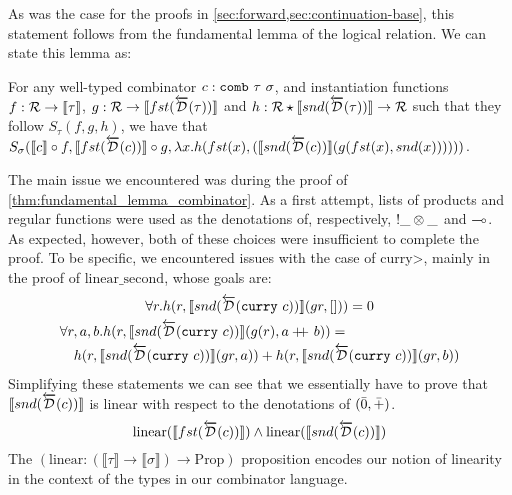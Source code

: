   As was the case for the proofs in \cref{sec:forward,sec:continuation-base}, this statement follows from the fundamental lemma of the logical relation.
  We can state this lemma as:
  \begin{proposition}\label{thm:fundamental_lemma_combinator}
    For any well-typed combinator $c : \texttt{comb}\ \tau\ \sigma$, and instantiation functions $f : \mathcal{R} \rightarrow \llbracket \tau \rrbracket$, $g : \mathcal{R} \rightarrow \llbracket fst(\overleftarrow{\mathcal{D}}(\tau))\rrbracket$ and $h : \mathcal{R} \star \llbracket snd(\overleftarrow{\mathcal{D}}(\tau)) \rrbracket \rightarrow \mathcal{R}$ such that they follow $S_{\tau}(f, g, h)$, we have that $S_{\sigma}(\llbracket c\rrbracket \circ f, \llbracket fst(\Drev(c))\rrbracket \circ g, \lambda x. h (fst(x), \linebreak (\llbracket snd(\Drev(c))\rrbracket(g(fst(x), snd(x))))))$.
  \end{proposition}

  The main issue we encountered was during the proof of \cref{thm:fundamental_lemma_combinator}.
  As a first attempt, lists of products and regular functions were used as the denotations of, respectively, $!\_\otimes\_$ and $\multimap$.
  As expected, however, both of these choices were insufficient to complete the proof.
  To be specific, we encountered issues with the case of \<curry>, mainly in the proof of $\text{linear\_second}$, whose goals are:
  \begin{gather}
    \begin{multlined}\label{eqn:goal_1}
      \forall r. h(r, \llbracket snd(\Drev(\synCurry{c}))\rrbracket (g r, [])) = 0
    \end{multlined} \\
    \begin{multlined}\label{eqn:goal_2}
      \forall r, a, b. h(r, \llbracket snd(\Drev(\synCurry{c})) \rrbracket (g (r), a \doubleplus b)) = \\ h(r, \llbracket snd(\Drev(\synCurry{c})) \rrbracket (g r, a)) + h(r, \llbracket snd(\Drev(\synCurry{c})) \rrbracket (g r, b))
    \end{multlined}
  \end{gather}
  Simplifying these statements we can see that we essentially have to prove that $\llbracket snd(\overleftarrow{\mathcal{D}}(c)) \rrbracket$ is linear with respect to the denotations of $(\bar{0}, \bar{+})$.
  \begin{equation}\label{eqn:linear_c}
    \text{linear}(\llbracket fst(\overleftarrow{\mathcal{D}}(c))\rrbracket) \wedge
      \text{linear}(\llbracket snd(\overleftarrow{\mathcal{D}}(c))\rrbracket)
  \end{equation}
  The $(\text{linear} : (\llbracket \tau \rrbracket \rightarrow \llbracket \sigma \rrbracket) \rightarrow \text{Prop})$ proposition encodes our notion of linearity in the context of the types in our combinator language.

